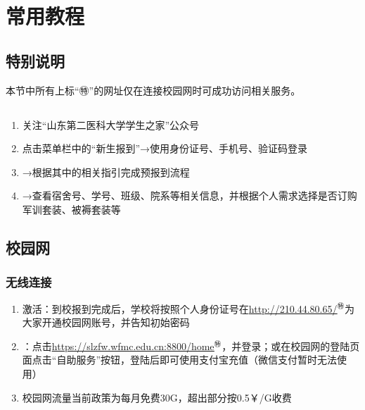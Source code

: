 \chapter[常用教程]{常用教程}

\section*{特别说明}
本节中所有上标“㊕”的网址仅在连接校园网时可成功访问相关服务。

\section[新生信息查询]{}
\label{freshman_query}
\begin{enumerate}
      \item 关注“山东第二医科大学学生之家”公众号
      \item 点击菜单栏中的“新生报到”→使用身份证号、手机号、验证码登录
      \item →根据其中的相关指引完成预报到流程
      \item →查看宿舍号、学号、班级、院系等相关信息，并根据个人需求选择是否订购军训套装、被褥套装\footnotemark 等
\end{enumerate}

\section[校园网]{校园网}
\subsection[无线连接]{无线连接}
\label{wifi_register}
\begin{enumerate}
      \item 激活：到校报到完成后，学校将按照个人身份证号在\uline{\href{http://210.44.80.65/}{http://210.44.80.65/}$^㊕$}为大家开通校园网账号，并告知初始密码\footnotemark
      \item \textbf{}：点击\uline{\href{https://slzfw.wfmc.edu.cn:8800/home/}{https://slzfw.wfmc.edu.cn:8800/home}$^㊕$}，并登录；或在校园网的登陆页面点击“自助服务”按钮\footnotemark，登陆后即可使用支付宝充值（微信支付暂时无法使用）
      \item 校园网流量当前政策为每月免费30G，超出部分按0.5\textsf{￥}/G收费
\end{enumerate}

